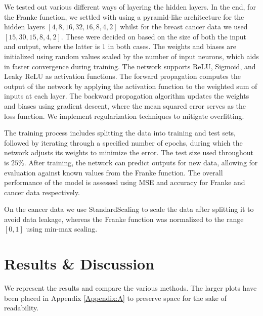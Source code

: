 \documentclass[%
reprint,s
amsmath,amssymb,
aps,
]{revtex4-2}
\begin{document}
We tested out various different ways of layering the hidden layers. In the end, for the Franke function, we settled with using a pyramid-like architecture for the hidden layers $[4,8,16,32,16,8,4,2]$ whilst for the breast cancer data we used $[15,30,15,8,4,2]$. These were decided on based on the size of both the input and output, where the latter is $1$ in both cases. The weights and biases are initialized using random values scaled by the number of input neurons, which aids in faster convergence during training. The network supports ReLU, Sigmoid, and Leaky ReLU as activation functions. The forward propagation computes the output of the network by applying the activation function to the weighted sum of inputs at each layer. The backward propagation algorithm updates the weights and biases using gradient descent, where the mean squared error serves as the loss function. We implement regularization techniques to mitigate overfitting.

The training process includes splitting the data into training and test sets, followed by iterating through a specified number of epochs, during which the network adjusts its weights to minimize the error. The test size used throughout is $25\%$. After training, the network can predict outputs for new data, allowing for evaluation against known values from the Franke function. The overall performance of the model is assessed using MSE and accuracy for Franke and cancer data respectively.

On the cancer data we use StandardScaling to scale the data after splitting it to avoid data leakage, whereas the Franke function was normalized to the range $[0,1]$ using min-max scaling.


\section{Results \& Discussion}
We represent the results and compare the various methods. The larger plots have been placed in Appendix \ref{Appendix:A} to preserve space for the sake of readability.
\end{document}
